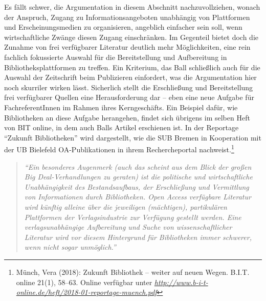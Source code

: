\documentclass[a4paper,
fontsize=11pt,
oneside,
numbers=noperiodatend,
parskip=half-,
bibliography=totoc,
final
]{scrartcl}
\begin{document}
Es fällt schwer, die Argumentation in diesem Abschnitt nachzuvollziehen,
wonach der Anspruch, Zugang zu Informationsangeboten unabhängig von
Plattformen und Erscheinungsmedien zu organisieren, angeblich einfacher
sein soll, wenn wirtschaftliche Zwänge diesen Zugang einschränken. Im
Gegenteil bietet doch die Zunahme von frei verfügbarer Literatur
deutlich mehr Möglichkeiten, eine rein fachlich fokussierte Auswahl für
die Bereitstellung und Aufbereitung in Bibliotheksplattformen zu
treffen. Ein Kriterium, das Ball schließlich auch für die Auswahl der
Zeitschrift beim Publizieren einfordert, was die Argumentation hier noch
skurriler wirken lässt. Sicherlich stellt die Erschließung und
Bereitstellung frei verfügbarer Quellen eine Herausforderung dar -- eben
eine neue Aufgabe für FachreferentInnen im Rahmen ihres Kerngeschäfts.
Ein Beispiel dafür, wie Bibliotheken an diese Aufgabe herangehen, findet
sich übrigens im selben Heft von BIT online, in dem auch Balls Artikel
erschienen ist. In der Reportage \enquote{Zukunft Bibliotheken} wird
dargestellt, wie die SUB Bremen in Kooperation mit der UB Bielefeld
OA-Publikationen in ihrem Rechercheportal nachweist.\footnote{Münch,
  Vera (2018): Zukunft Bibliothek -- weiter auf neuen Wegen. B.I.T.
  online 21(1), 58--63. Online verfügbar unter
  \href{http://www.b-i-t-online.de/heft/2018-01-reportage-muench.pdf}{\emph{http://www.b-i-t-online.de/heft/2018-01-reportage-muench.pdf}}}

\begin{quote}
\emph{\enquote{Ein besonderes Augenmerk (auch das scheint aus dem Blick
der großen Big Deal-Verhandlungen zu geraten) ist die politische und
wirtschaftliche Unabhängigkeit des Bestandsaufbaus, der Erschließung und
Vermittlung von Informationen durch Bibliotheken. Open Access verfügbare
Literatur wird künftig alleine über die jeweiligen (mächtigen),
partikulären Plattformen der Verlagsindustrie zur Verfügung gestellt
werden. Eine verlagsunabhängige Aufbereitung und Suche von
wissenschaftlicher Literatur wird vor diesem Hintergrund für
Bibliotheken immer schwerer, wenn nicht sogar unmöglich.}}
\end{quote}
\end{document}

